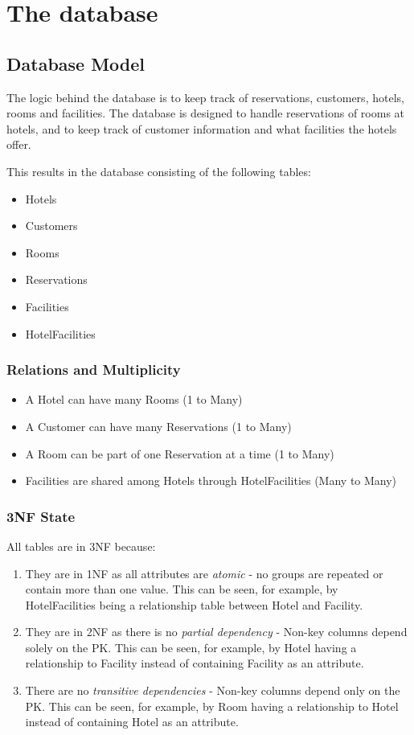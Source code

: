 \chapter{The database}
\label{chapter:the-database}

\section{Database Model}
The logic behind the database is to keep track of reservations, customers, hotels, rooms and facilities.
The database is designed to handle reservations of rooms at hotels, and to keep track of customer information and what facilities the hotels offer.

This results in the database consisting of the following tables:
\begin{itemize}
  \item Hotels
  \item Customers
  \item Rooms
  \item Reservations
  \item Facilities
  \item HotelFacilities
\end{itemize}

\subsection{Relations and Multiplicity}

\begin{itemize}
  \item A Hotel can have many Rooms (1 to Many)
  \item A Customer can have many Reservations (1 to Many)
  \item A Room can be part of one Reservation at a time (1 to Many)
  \item Facilities are shared among Hotels through HotelFacilities (Many to Many)
\end{itemize}

\subsection{3NF State}
All tables are in 3NF because:
\begin{enumerate}
  \item They are in 1NF as all attributes are \emph{atomic} - no groups are repeated or contain more than one value.
      This can be seen, for example, by HotelFacilities being a relationship table between Hotel and Facility.
  \item They are in 2NF as there is no \emph{partial dependency} - Non-key columns depend solely on the PK.
      This can be seen, for example, by Hotel having a relationship to Facility instead of containing Facility as an attribute.
  \item There are no \emph{transitive dependencies} - Non-key columns depend only on the PK.
      This can be seen, for example, by Room having a relationship to Hotel instead of containing Hotel as an attribute.
\end{enumerate}

